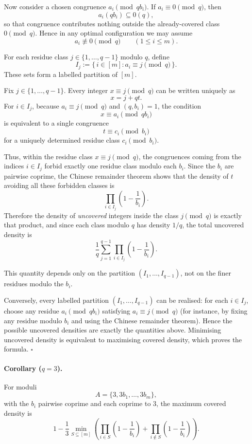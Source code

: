 Now consider a chosen congruence $a_i \pmod{qb_i}$. If $a_i\equiv 0\pmod q$, then
\[
a_i(qb_i)\subseteq 0(q),
\]
so that congruence contributes nothing outside the already-covered class $0\pmod q$. Hence in any optimal configuration we may assume
\[
a_i\not\equiv 0\pmod q \qquad (1\le i\le m).
\]

For each residue class $j\in\{1,\dots,q-1\}$ modulo $q$, define
\[
I_j:=\{\,i\in[m]: a_i\equiv j\pmod q\,\}.
\]
These sets form a labelled partition of $[m]$.

Fix $j\in\{1,\dots,q-1\}$. Every integer $x\equiv j\pmod q$ can be written uniquely as
\[
x=j+qt.
\]
For $i\in I_j$, because $a_i\equiv j\pmod q$ and $(q,b_i)=1$, the condition
\[
x\equiv a_i\pmod{qb_i}
\]
is equivalent to a single congruence
\[
t\equiv c_i \pmod{b_i}
\]
for a uniquely determined residue class $c_i \pmod{b_i}$.

Thus, within the residue class $x\equiv j\pmod q$, the congruences coming from the indices $i\in I_j$ forbid exactly one residue class modulo each $b_i$. Since the $b_i$ are pairwise coprime, the Chinese remainder theorem shows that the density of $t$ avoiding all these forbidden classes is
\[
\prod_{i\in I_j}\left(1-\frac{1}{b_i}\right).
\]
Therefore the density of \emph{uncovered} integers inside the class $j\pmod q$ is exactly that product, and since each class modulo $q$ has density $1/q$, the total uncovered density is
\[
\frac{1}{q}\sum_{j=1}^{q-1}\prod_{i\in I_j}\left(1-\frac{1}{b_i}\right).
\]

This quantity depends only on the partition $(I_1,\dots,I_{q-1})$, not on the finer residues modulo the $b_i$.

Conversely, every labelled partition $(I_1,\dots,I_{q-1})$ can be realised: for each $i\in I_j$, choose any residue $a_i\pmod{qb_i}$ satisfying $a_i\equiv j\pmod q$ (for instance, by fixing any residue modulo $b_i$ and using the Chinese remainder theorem). Hence the possible uncovered densities are exactly the quantities above. Minimising uncovered density is equivalent to maximising covered density, which proves the formula.
\hfill $\square$

\paragraph{Corollary ($q=3$).}
For moduli
\[
A=\{3,3b_1,\dots,3b_m\},
\]
with the $b_i$ pairwise coprime and each coprime to $3$, the maximum covered density is
\[
1-\frac{1}{3}\min_{S\subseteq[m]}
\left(
\prod_{i\in S}\left(1-\frac{1}{b_i}\right)
+
\prod_{i\notin S}\left(1-\frac{1}{b_i}\right)
\right).
\]

